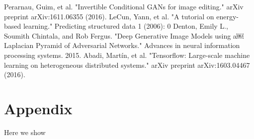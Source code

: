 \documentclass{article}
\begin{document}
\noindent [13] Perarnau, Guim, et al. "Invertible Conditional GANs for image editing." arXiv preprint arXiv:1611.06355 (2016). \newline
\noindent [14] LeCun, Yann, et al. "A tutorial on energy-based learning." Predicting structured data 1 (2006): 0 \newline
\noindent [15] Denton, Emily L., Soumith Chintala, and Rob Fergus. "Deep Generative Image Models using a￼ Laplacian Pyramid of Adversarial Networks." Advances in neural information processing systems. 2015. \newline
\noindent [16] Abadi, Martín, et al. "Tensorflow: Large-scale machine learning on heterogeneous distributed systems." arXiv preprint arXiv:1603.04467 (2016).



\appendix

\section{Appendix}
Here we show 
\end{document}
